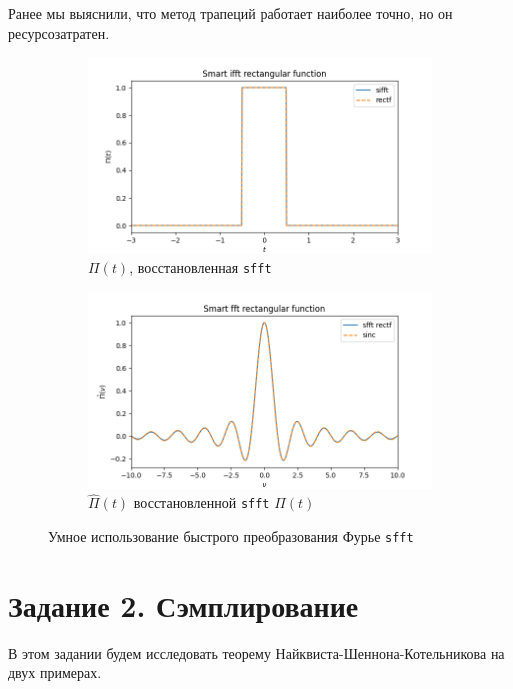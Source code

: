 \documentclass[a4paper, 12pt]{article}
\begin{document}
    Ранее мы выяснили, что метод трапеций работает наиболее точно, но он ресурсозатратен.
    \begin{figure}[H]
        \centering
        \begin{subfigure}{0.45\textwidth}
            \centering
            \includegraphics[width=\linewidth]{sifft.png}
            \caption{$\Pi(t)$, восстановленная \texttt{sfft}}
            \label{fig:sifft}
        \end{subfigure}
        \hspace{5mm}
        \begin{subfigure}{0.45\textwidth}
            \centering
            \includegraphics[width=\linewidth]{sfft.png}
            \caption{$\hat{\Pi}(t)$ восстановленной \texttt{sfft} $\Pi(t)$}
            \label{fig:sfft}
        \end{subfigure}
        \caption{Умное использование быстрого преобразования Фурье \texttt{sfft}}
        \label{fig:sffts}
    \end{figure}


    \section{Задание 2. Сэмплирование}
    В этом задании будем исследовать теорему Найквиста-Шеннона-Котельникова на двух примерах.
\end{document}
